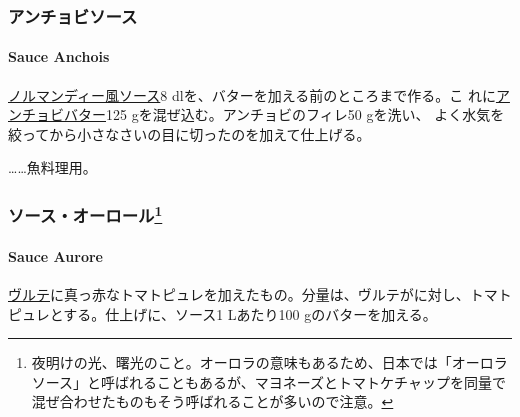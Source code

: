 \begin{recette}
\maeaki

\hypertarget{ux30a2ux30f3ux30c1ux30e7ux30d3ux30bdux30fcux30b9}{%
\subsubsection{アンチョビソース}\label{ux30a2ux30f3ux30c1ux30e7ux30d3ux30bdux30fcux30b9}}

\hypertarget{sauce-anchois}{%
\paragraph{Sauce Anchois}\label{sauce-anchois}}


\href{}{ノルマンディー風ソース}8
dlを、バターを加える前のところまで作る。こ
れに\href{}{アンチョビバター}125 gを混ぜ込む。アンチョビのフィレ50
gを洗い、 よく水気を絞ってから小さなさいの目に切ったのを加えて仕上げる。

\ldots{}\ldots{}魚料理用。

\maeaki

\hypertarget{ux30bdux30fcux30b9ux30aaux30fcux30edux30fcux30eb4}{%
\subsubsection[ソース・オーロール]{\texorpdfstring{ソース・オーロール\footnote{夜明けの光、曙光のこと。オーロラの意味もあるため、日本では「オーロラソース」と呼ばれることもあるが、マヨネーズとトマトケチャップを同量で混ぜ合わせたものもそう呼ばれることが多いので注意。}}{ソース・オーロール}}\label{ux30bdux30fcux30b9ux30aaux30fcux30edux30fcux30eb4}}

\hypertarget{sauce-aurore}{%
\paragraph{Sauce Aurore}\label{sauce-aurore}}


\protect\hyperlink{veloute}{ヴルテ}に真っ赤なトマトピュレを加えたもの。分量は、ヴルテが\troisquarts{}に対し、トマトピュレ\unquart{}とする。仕上げに、ソース1
Lあたり100 gのバターを加える。


\end{recette}
